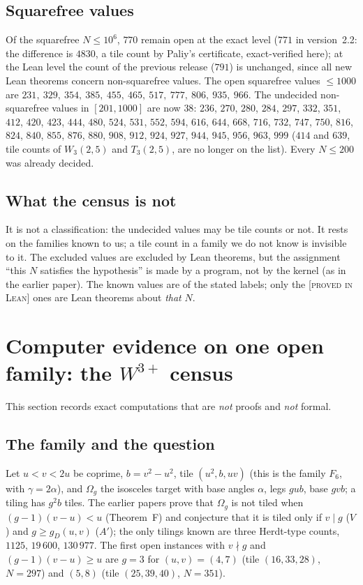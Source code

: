 \documentclass[11pt,reqno]{amsart}
\theoremstyle{plain}
\theoremstyle{definition}
\newcommand{\lab}[1]{\textup{[\textsc{#1}]}}
\newcommand{\PL}{\lab{proved in Lean}}
\begin{document}
\subsection{Squarefree values}
Of the squarefree $N\le10^6$, $770$ remain open at the exact level ($771$ in version~2.2: the difference is $4830$, a tile count by Paliy's certificate, exact-verified here); at the Lean level the count of the previous release ($791$) is unchanged, since all new Lean theorems concern non-squarefree values.
The open squarefree values $\le1000$ are $231,\ 329,\ 354,\ 385,\ 455,\ 465,\ 517,\ 777,\ 806,\ 935,\ 966$.
The undecided non-squarefree values in $[201,1000]$ are now $38$: $236$, $270$, $280$, $284$, $297$, $332$, $351$, $412$, $420$, $423$, $444$, $480$, $524$, $531$, $552$, $594$, $616$, $644$, $668$, $716$, $732$, $747$, $750$, $816$, $824$, $840$, $855$, $876$, $880$, $908$, $912$, $924$, $927$, $944$, $945$, $956$, $963$, $999$ ($414$ and $639$, tile counts of $W_3(2,5)$ and $T_3(2,5)$, are no longer on the list).
Every $N\le200$ was already decided.

\subsection{What the census is not}
It is not a classification: the undecided values may be tile counts or not. It rests on the families known to us; a tile count in a family we do not know is invisible to it.
The excluded values are excluded by Lean theorems, but the assignment ``this $N$ satisfies the hypothesis'' is made by a program, not by the kernel (as in the earlier paper).
The known values are of the stated labels; only the \PL{} ones are Lean theorems about \emph{that} $N$.

\section{Computer evidence on one open family: the $W^{3+}$ census}\label{sec:w3}
This section records exact computations that are \emph{not} proofs and \emph{not} formal.
\subsection{The family and the question}
Let $u<v<2u$ be coprime, $b=v^2-u^2$, tile $(u^2,b,uv)$ (this is the family $F_6$, with $\gamma=2\alpha$), and $\Omega_g$ the isosceles target with base angles $\alpha$, legs $gub$, base $gvb$; a tiling has $g^2b$ tiles.
The earlier papers prove that $\Omega_g$ is not tiled when $(g-1)(v-u)<u$ (Theorem~F) and conjecture that it is tiled only if $v\mid g$ ($V$) and $g\ge g_D(u,v)$ ($A'$); the only tilings known are three Herdt-type counts, $1125$, $19\,600$, $130\,977$.
The first open instances with $v\nmid g$ and $(g-1)(v-u)\ge u$ are $g=3$ for $(u,v)=(4,7)$ (tile $(16,33,28)$, $N=297$) and $(5,8)$ (tile $(25,39,40)$, $N=351$).
\end{document}
